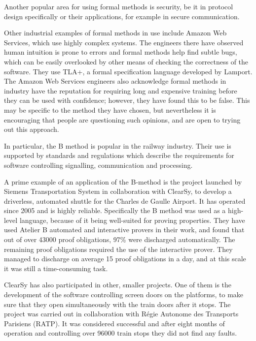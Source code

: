 \documentclass[12pt,journal,duplex]{IEEEtran}
\begin{document}
	Another popular area for using formal methods is security, be it in protocol design specifically\cite{security} or their applications, for example in secure communication\cite{security2}.

	Other industrial examples of formal methods in use include Amazon Web Services, which use highly complex systems\cite{amazon}. The engineers there have observed human intuition is prone to errors and formal methods help find subtle bugs, which can be easily overlooked by other means of checking the correctness of the software. They use TLA+, a formal specification language developed by Lamport\cite{TLA}. The Amazon Web Services engineers also acknowledge formal methods in industry have the reputation for requiring long and expensive training before they can be used with confidence; however, they have found this to be false. This may be specific to the method they have chosen, but nevertheless it is encouraging that people are questioning such opinions, and are open to trying out this approach.

	In particular, the B method is popular in the railway industry. Their use is supported by standards and regulations which describe the requirements for software controlling signalling, communication and processing\cite{railway standard}.

	A prime example of an application of the B-method is the project launched by Siemens Transportation System in collaboration with ClearSy, to develop a driverless, automated shuttle for the Charles de Gaulle Airport\cite{airport shuttle}. It has operated since 2005 and is highly reliable. Specifically the B method was used as a high-level language, because of it being well-suited for proving properties. They have used Atelier B automated and interactive provers in their work, and found that out of over 43000 proof obligations, 97\% were discharged automatically. The remaining proof obligations required the use of the interactive prover. They managed to discharge on average 15 proof obligations in a day, and at this scale it was still a time-consuming task.

	ClearSy has also participated in other, smaller projects. One of them is the development of the software controlling screen doors on the platforms, to make sure that they open simultaneously with the train doors after it stops. The project was carried out in collaboration with R\'{e}gie Autonome des Transports Parisiens (RATP). It was considered successful and after eight months of operation and controlling over 96000 train stops they did not find any faults\cite{screen doors}.
\end{document}
